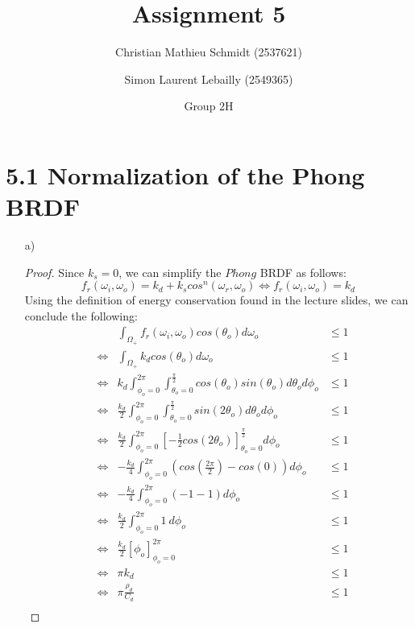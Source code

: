 \documentclass{article}
\title{Assignment 5}
\author{Christian Mathieu Schmidt (2537621)
\and Simon Laurent Lebailly (2549365)\\
\and Group 2H}
\begin{document}
\maketitle


\section*{5.1 Normalization of the Phong BRDF} \label{ex1}
\begin{enumerate}[label=(\alph*)]
    \item[a)]
    \begin{proof}
    Since $k_s=0$, we can simplify the $Phong$ BRDF as follows:\\
    $$f_r({\omega}_i, {\omega}_o) = k_d + k_s cos^n({\omega}_r, {\omega}_o) \Leftrightarrow f_r({\omega}_i, {\omega}_o) = k_d$$
    Using the definition of energy conservation found in the lecture slides, we can conclude the following:
    \begin{align}
        & & \int_{\Omega_+ } f_r({\omega}_i, {\omega}_o)cos({\theta}_o) d{\omega}_o &\leq 1\\ 
        &\Leftrightarrow & \int_{\Omega_+} k_d cos({\theta}_o) d{\omega}_o &\leq 1\\
        &\Leftrightarrow & k_d \int_{\phi_o = 0}^{2\pi} \int_{\theta_o = 0}^{\frac{\pi}{2}} cos({\theta}_o) sin(\theta_o) d{\theta}_o d{\phi}_o &\leq 1\\
        &\Leftrightarrow & \frac{k_d}{2} \int_{\phi_o = 0}^{2\pi} \int_{\theta_o = 0}^{\frac{\pi}{2}} sin(2\theta_o) d{\theta}_o d{\phi}_o &\leq 1\\
        &\Leftrightarrow & \frac{k_d}{2} \int_{\phi_o = 0}^{2\pi} \left[ - \frac{1}{2} cos({2\theta}_o) \right]_{\theta_o = 0}^{\frac{\pi}{2}} d{\phi}_o &\leq 1\\
        &\Leftrightarrow & -\frac{k_d}{4} \int_{\phi_o = 0}^{2\pi} \left(cos \left( \frac{2\pi}{2} \right) - cos(0) \right) d{\phi}_o &\leq 1\\
        &\Leftrightarrow & -\frac{k_d}{4} \int_{\phi_o = 0}^{2\pi} \left(-1 - 1 \right) d{\phi}_o &\leq 1\\
        &\Leftrightarrow & \frac{k_d}{2} \int_{\phi_o = 0}^{2\pi} 1\ d{\phi}_o &\leq 1\\
        &\Leftrightarrow & \frac{k_d}{2} \left[ \phi_o \right]_{\phi_o = 0}^{2\pi} &\leq 1\\
        &\Leftrightarrow & \pi k_d &\leq 1\\
        &\Leftrightarrow & \pi \frac{{\rho}_d}{C_d} &\leq 1\\

\end{align}
\end{proof}
\end{enumerate}
\end{document}
